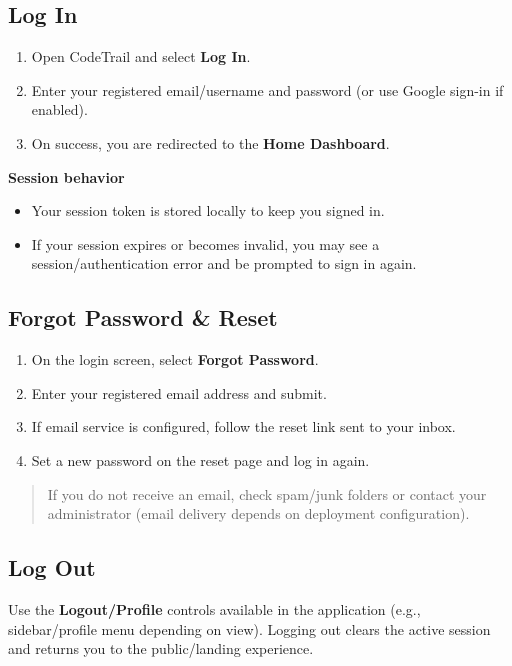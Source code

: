 \documentclass[11pt,a4paper]{article}
\begin{document}
\subsection{Log In}
\begin{enumerate}
  \item Open CodeTrail and select \textbf{Log In}.
  \item Enter your registered email/username and password (or use Google sign-in if enabled).
  \item On success, you are redirected to the \textbf{Home Dashboard}.
\end{enumerate}

\textbf{Session behavior}
\begin{itemize}
  \item Your session token is stored locally to keep you signed in.
  \item If your session expires or becomes invalid, you may see a session/authentication error and be prompted to sign in again.
\end{itemize}

\subsection{Forgot Password \& Reset}
\begin{enumerate}
  \item On the login screen, select \textbf{Forgot Password}.
  \item Enter your registered email address and submit.
  \item If email service is configured, follow the reset link sent to your inbox.
  \item Set a new password on the reset page and log in again.
\end{enumerate}

\begin{quote}
If you do not receive an email, check spam/junk folders or contact your administrator (email delivery depends on deployment configuration).
\end{quote}

\subsection{Log Out}
Use the \textbf{Logout/Profile} controls available in the application (e.g., sidebar/profile menu depending on view). Logging out clears the active session and returns you to the public/landing experience.
\end{document}
